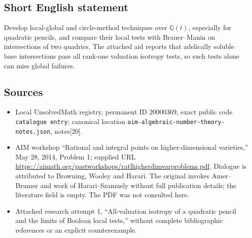 \documentclass[11pt]{article}
\newcommand{\Q}{\mathbb{Q}}
\begin{document}
\subsection{Short English statement}
Develop local-global and circle-method techniques over \(\Q(t)\), especially for quadratic pencils, and compare their local tests with Brauer--Manin on intersections of two quadrics. The attached aid reports that adelically soluble base intersections pass all rank-one valuation isotropy tests, so such tests alone can miss global failures.
\subsection{Sources}
\begin{itemize}
\item Local UnsolvedMath registry, permanent ID \(20000369\), exact public code \texttt{catalogue entry}; canonical location \texttt{aim-algebraic-number-theory-notes.json}, notes[20].
\item AIM workshop ``Rational and integral points on higher-dimensional varieties,'' May 28, 2014, Problem 1; supplied URL \url{https://aimath.org/pastworkshops/ratlhigherdimvarproblems.pdf}. Dialogue is attributed to Browning, Wooley and Harari. The original invokes Amer--Brumer and work of Harari--Szamuely without full publication details; the literature field is empty. The PDF was not consulted here.
\item Attached research attempt 1, ``All-valuation isotropy of a quadratic pencil and the limits of Boolean local tests,'' without complete bibliographic references or an explicit counterexample.
\end{itemize}
\end{document}
